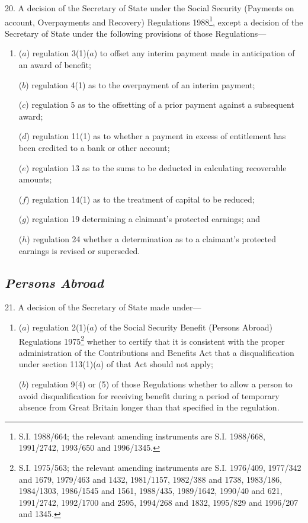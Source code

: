 \documentclass[12pt,a4paper]{article}
\begin{document}
20.  A decision of the Secretary of State under the Social Security (Payments on account, Overpayments and Recovery) Regulations 1988\footnote{\frenchspacing S.I. 1988/664; the relevant amending instruments are S.I. 1988/668, 1991/2742, 1993/650 and 1996/1345.}, except a decision of the Secretary of State under the following provisions of those Regulations—
\begin{enumerate}\item[]
($a$) regulation 3(1)($a$) to offset any interim payment made in anticipation of an award of benefit;

($b$) regulation 4(1) as to the overpayment of an interim payment;

($c$) regulation 5 as to the offsetting of a prior payment against a subsequent award;

($d$) regulation 11(1) as to whether a payment in excess of entitlement has been credited to a bank or other account;

($e$) regulation 13 as to the sums to be deducted in calculating recoverable amounts;

($f$) regulation 14(1) as to the treatment of capital to be reduced;

($g$) regulation 19 determining a claimant’s protected earnings; and

($h$) regulation 24 whether a determination as to a claimant’s protected earnings is revised or superseded.
\end{enumerate}

\subsection*{\itshape Persons Abroad}

\enlargethispage{\baselineskip}

21.  A decision of the Secretary of State made under—
\begin{enumerate}\item[]
($a$) regulation 2(1)($a$) of the Social Security Benefit (Persons Abroad) Regulations 1975\footnote{\frenchspacing S.I. 1975/563; the relevant amending instruments are S.I. 1976/409, 1977/342 and 1679, 1979/463 and 1432, 1981/1157, 1982/388 and 1738, 1983/186, 1984/1303, 1986/1545 and 1561, 1988/435, 1989/1642, 1990/40 and 621, 1991/2742, 1992/1700 and 2595, 1994/268 and 1832, 1995/829 and 1996/207 and 1345.} whether to certify that it is consistent with the proper administration of the Contributions and Benefits Act that a disqualification under section 113(1)($a$) of that Act should not apply;

($b$) regulation 9(4) or (5) of those Regulations whether to allow a person to avoid disqualification for receiving benefit during a period of temporary absence from Great Britain longer than that specified in the regulation.
\end{enumerate}
\end{document}
